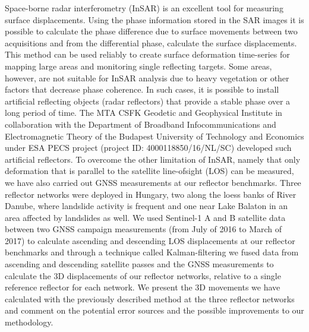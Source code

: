 \documentclass[a0, 18pt, landscape]{a0poster}
\begin{document}
\begin{mdframed}[linecolor=acol, linewidth=4pt,
    innerleftmargin=20pt, innerrightmargin=20pt,
    innerbottommargin=25pt, innertopmargin=30pt,
    backgroundcolor=abcol,
    frametitleaboveskip=15pt, frametitlebelowskip=10pt,
    roundcorner=20pt, frametitle={\LARGE Abstract},
    frametitlealignment=\center]

\columnsep=30pt


\begin{multicols}{2}

Space-borne radar interferometry (InSAR) is an excellent tool for measuring surface displacements. Using the phase information stored in the SAR images it is possible to calculate the phase difference due to surface movements between two acquisitions and from the differential phase, calculate the surface displacements.
This method can be used reliably to create surface deformation time-series for mapping large areas and monitoring single reflecting targets. Some areas, however, are not suitable for InSAR analysis due to heavy vegetation or other factors that decrease phase coherence. In such cases, it is possible to install artificial reflecting objects (radar reflectors) that provide a stable phase over a long period of time.
The MTA CSFK Geodetic and Geophysical Institute in collaboration with the Department of Broadband Infocommunications and Electromagnetic Theory of the Budapest University of Technology and Economics under ESA PECS project (project ID: 4000118850/16/NL/SC) developed such artificial reflectors.
To overcome the other limitation of InSAR, namely that only deformation that is parallel to the satellite line-ofsight (LOS) can be measured, we have also carried out GNSS measurements at our reflector benchmarks.
Three reflector networks were deployed in Hungary, two along the loess banks of River Danube, where landslide activity is frequent and one near Lake Balaton in an area affected by landslides as well.
We used Sentinel-1 A and B satellite data between two GNSS campaign measurements (from July of 2016 to March of 2017) to calculate ascending and descending LOS displacements at our reflector benchmarks and through a technique called Kalman-filtering we fused data from ascending and descending satellite passes and the GNSS measurements to calculate the 3D displacements of our reflector networks, relative to a single reference reflector for each network.
We present the 3D movements we have calculated with the previously described method at the three reflector networks and comment on the potential error sources and the possible improvements to our methodology.
\end{multicols}

\end{mdframed}
\end{document}
